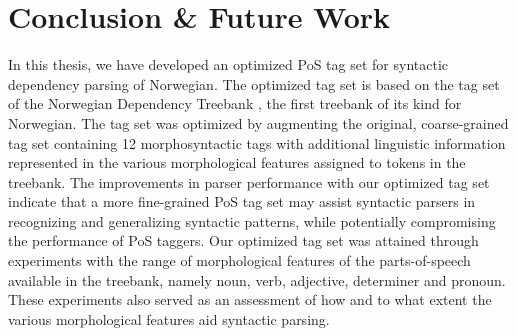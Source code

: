 \documentclass[a4paper,12pt,english]{book}
\begin{document}

\chapter{Conclusion \& Future Work}
\label{chap:conclusion}
In this thesis, we have developed an optimized PoS tag set for syntactic
dependency parsing of Norwegian. The optimized tag set is based on the tag set
of the Norwegian Dependency Treebank \cite{Sol:Skj:Ovr:14}, the first treebank
of its kind for Norwegian. The tag set was optimized by augmenting the
original, coarse-grained tag set containing 12 morphosyntactic tags with
additional linguistic information represented in the various morphological
features assigned to tokens in the treebank. The improvements in parser
performance with our optimized tag set indicate that a more fine-grained PoS
tag set
may assist syntactic parsers in recognizing and generalizing syntactic
patterns, while potentially compromising the performance of PoS taggers.
Our optimized tag set was attained through experiments with the range of
morphological features of the parts-of-speech available in the treebank, namely
noun, verb, adjective, determiner and pronoun. These experiments also served as
an assessment of how and to what extent the various morphological features aid
syntactic parsing.
\end{document}
